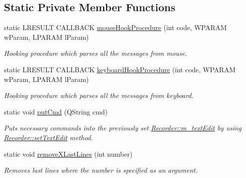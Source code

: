 \subsection*{Static Private Member Functions}
\begin{DoxyCompactItemize}
\item 
static L\-R\-E\-S\-U\-L\-T C\-A\-L\-L\-B\-A\-C\-K \hyperlink{class_recorder_a4baab970c1b426dd37a486278caaf851}{mouse\-Hook\-Procedure} (int code, W\-P\-A\-R\-A\-M w\-Param, L\-P\-A\-R\-A\-M l\-Param)
\begin{DoxyCompactList}\small\item\em Hooking procedure which parses all the messages from mouse. \end{DoxyCompactList}\item 
static L\-R\-E\-S\-U\-L\-T C\-A\-L\-L\-B\-A\-C\-K \hyperlink{class_recorder_a3f6a34174b2adab522364a5a1dc2b72e}{keyboard\-Hook\-Procedure} (int code, W\-P\-A\-R\-A\-M w\-Param, L\-P\-A\-R\-A\-M l\-Param)
\begin{DoxyCompactList}\small\item\em Hooking procedure which parses all the messages from keyboard. \end{DoxyCompactList}\item 
static void \hyperlink{class_recorder_ab6de951e02844b255a9d506022f623df}{put\-Cmd} (Q\-String cmd)
\begin{DoxyCompactList}\small\item\em Puts necessary commands into the previously set \hyperlink{class_recorder_a738be0679e1861350cf20e4c7fe0a8af}{Recorder\-::m\-\_\-text\-Edit} by using \hyperlink{class_recorder_a28cae819dd8860adc54c969319802811}{Recorder\-::set\-Text\-Edit} method. \end{DoxyCompactList}\item 
static void \hyperlink{class_recorder_a924e4a55880d9beaae834998b5653fad}{remove\-X\-Last\-Lines} (int number)
\begin{DoxyCompactList}\small\item\em Removes last lines where the number is specified as an argument. \end{DoxyCompactList}\end{DoxyCompactItemize}
